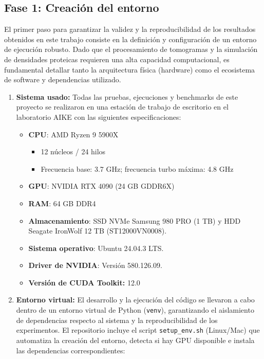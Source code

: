 \subsection{Fase 1: Creación del entorno}

El primer paso para garantizar la validez y la reproducibilidad de los resultados obtenidos en este trabajo consiste en la definición y configuración de un entorno de ejecución robusto. Dado que el procesamiento de tomogramas y la simulación de densidades proteicas requieren una alta capacidad computacional, es fundamental detallar tanto la arquitectura física (hardware) como el ecosistema de software y dependencias utilizado.
\begin{enumerate}
    \item \textbf{Sistema usado:} Todas las pruebas, ejecuciones y benchmarks de este proyecto se realizaron en una estación de trabajo de escritorio en el laboratorio AIKE con las siguientes especificaciones:

        \begin{itemize}
            \item \textbf{CPU}: AMD Ryzen 9 5900X
            \begin{itemize}
                \item 12 núcleos / 24 hilos
                \item Frecuencia base: 3.7 GHz; frecuencia turbo máxima: 4.8 GHz
            \end{itemize}
            \item \textbf{GPU}: NVIDIA RTX 4090 (24 GB GDDR6X)
            \item \textbf{RAM}: 64 GB DDR4
            \item \textbf{Almacenamiento}: SSD NVMe Samsung 980 PRO (1 TB) y HDD Seagate IronWolf 12 TB (ST12000VN0008).
            \item \textbf{Sistema operativo}: Ubuntu 24.04.3 LTS.
            \item \textbf{Driver de NVIDIA}:  Versión 580.126.09. 
            \item \textbf{Versión de CUDA Toolkit:} 12.0 
        \end{itemize}

    \item \textbf{Entorno virtual: } El desarrollo y la ejecución del código se llevaron a cabo dentro de un entorno virtual de Python (\texttt{venv}), garantizando el aislamiento de dependencias respecto al sistema y la reproducibilidad de los experimentos. El repositorio incluye el script \texttt{setup\_env.sh} (Linux/Mac) que automatiza la creación del entorno, detecta si hay GPU disponible e instala las dependencias correspondientes:


\end{enumerate}
